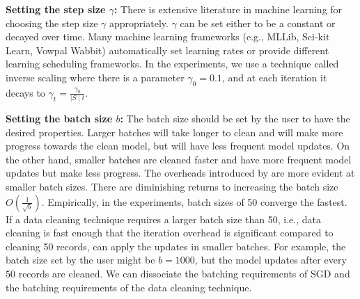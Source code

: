 \vspace{0.25em}

\noindent\textbf{ Setting the step size $\gamma$: } There is extensive literature in machine learning for choosing the step size $\gamma$ appropriately. $\gamma$ can be set either to be a constant or decayed over time. Many machine learning frameworks (e.g., MLLib, Sci-kit Learn, Vowpal Wabbit) automatically set learning rates or provide different learning scheduling frameworks. 
In the experiments, we use a technique called inverse scaling where there is a parameter $\gamma_0=0.1$, and at each iteration it decays to $\gamma_t = \frac{\gamma_0}{\mid S \mid t}$. 

\vspace{0.25em}

\noindent\textbf{ Setting the batch size $b$: } The batch size should be set by the user to have the desired properties.
Larger batches will take longer to clean and will make more progress towards the clean model, but will have less frequent model updates.
On the other hand, smaller batches are cleaned faster and have more frequent model updates but make less progress.
The overheads introduced by \sys are more evident at smaller batch sizes.
There are diminishing returns to increasing the batch size $O(\frac{1}{\sqrt{b}})$.
Empirically, in the experiments, batch sizes of 50 converge the fastest.
If a data cleaning technique requires a larger batch size than 50, i.e., data cleaning is fast enough that the iteration overhead is significant compared to cleaning 50 records, \sys can apply the updates in smaller batches.
For example, the batch size set by the user might be $b=1000$, but the model updates after every $50$ records are cleaned.
We can dissociate the batching requirements of SGD and the batching requirements of the data cleaning technique.

